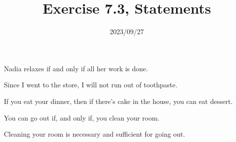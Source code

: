 
\title{Exercise 7.3, Statements}
\date{2023/09/27}

\maketitle

\begin{enumerate}

\begin{statement}{Nadia relaxes if and only if all her work is done.}
\end{statement}

\begin{statement}{Since I went to the store, I will not run out of toothpaste.}
\end{statement}

\begin{statement}{If you eat your dinner, then if there’s cake in the house, you can eat dessert.}
\end{statement}

\begin{statement}{You can go out if, and only if, you clean your room.}
\end{statement}

\begin{statement}{Cleaning your room is necessary and sufficient for going out.}
\end{statement}


\end{enumerate}

